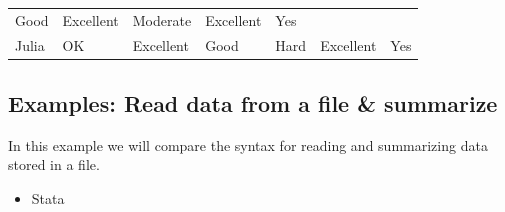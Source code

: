 \documentclass[]{book}
\providecommand{\tightlist}{%
  \setlength{\itemsep}{0pt}\setlength{\parskip}{0pt}}
\begin{document}
\begin{longtable}[]{@{}lllllll@{}}
\begin{minipage}[t]{0.13\columnwidth}
Good\strut
\end{minipage} & \begin{minipage}[t]{0.16\columnwidth}\raggedright
Excellent\strut
\end{minipage} & \begin{minipage}[t]{0.11\columnwidth}\raggedright
Moderate\strut
\end{minipage} & \begin{minipage}[t]{0.17\columnwidth}\raggedright
Excellent\strut
\end{minipage} & \begin{minipage}[t]{0.05\columnwidth}\raggedright
Yes\strut
\end{minipage}\tabularnewline
\begin{minipage}[t]{0.08\columnwidth}\raggedright
Julia\strut
\end{minipage} & \begin{minipage}[t]{0.10\columnwidth}\raggedright
OK\strut
\end{minipage} & \begin{minipage}[t]{0.13\columnwidth}\raggedright
Excellent\strut
\end{minipage} & \begin{minipage}[t]{0.16\columnwidth}\raggedright
Good\strut
\end{minipage} & \begin{minipage}[t]{0.11\columnwidth}\raggedright
Hard\strut
\end{minipage} & \begin{minipage}[t]{0.17\columnwidth}\raggedright
Excellent\strut
\end{minipage} & \begin{minipage}[t]{0.05\columnwidth}\raggedright
Yes\strut
\end{minipage}\tabularnewline
\bottomrule
\end{longtable}

\hypertarget{examples-read-data-from-a-file-summarize}{%
\subsection{Examples: Read data from a file \& summarize}\label{examples-read-data-from-a-file-summarize}}

In this example we will compare the syntax for reading and summarizing data stored in a file.

\begin{itemize}
\tightlist
\item
  Stata
\end{itemize}
\end{document}

